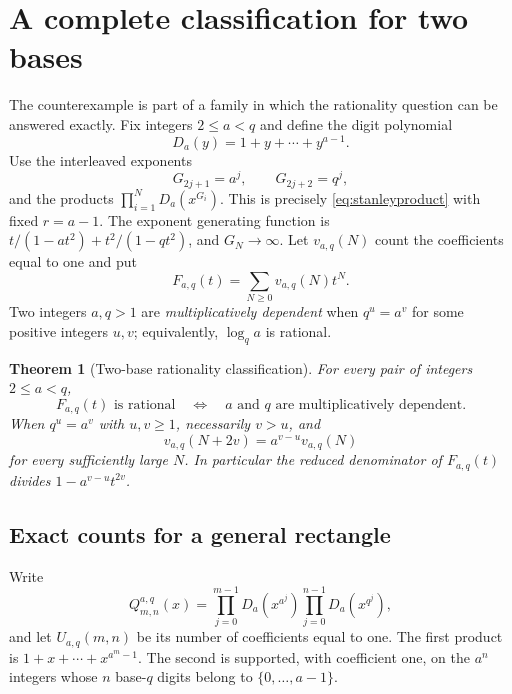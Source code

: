 \documentclass[11pt,letterpaper]{article}
\numberwithin{equation}{section}
\newtheorem{theorem}{Theorem}[section]
\theoremstyle{definition}
\theoremstyle{remark}
\begin{document}
\section{A complete classification for two bases}\label{sec:general}

The counterexample is part of a family in which the rationality question
can be answered exactly. Fix integers $2\le a<q$ and define the digit
polynomial
\begin{equation}\label{eq:digitpoly}
 D_a(y)=1+y+\cdots+y^{a-1}.
\end{equation}
Use the interleaved exponents
\begin{equation}\label{eq:generalexponents}
 G_{2j+1}=a^j,\qquad G_{2j+2}=q^j,
\end{equation}
and the products $\prod_{i=1}^N D_a(x^{G_i})$. This is precisely
\eqref{eq:stanleyproduct} with fixed $r=a-1$. The exponent generating
function is $t/(1-at^2)+t^2/(1-qt^2)$, and $G_N\to\infty$.
Let $v_{a,q}(N)$ count the coefficients equal to one and put
\[
 F_{a,q}(t)=\sum_{N\ge0}v_{a,q}(N)t^N.
\]
Two integers $a,q>1$ are \emph{multiplicatively dependent} when
$q^u=a^v$ for some positive integers $u,v$; equivalently,
$\log_q a$ is rational.

\begin{theorem}[Two-base rationality classification]\label{thm:classification}
For every pair of integers $2\le a<q$,
\begin{equation}\label{eq:classification}
 F_{a,q}(t)\text{ is rational}
 \quad\Longleftrightarrow\quad
 a\text{ and }q\text{ are multiplicatively dependent}.
\end{equation}
When $q^u=a^v$ with $u,v\ge1$, necessarily $v>u$, and
\begin{equation}\label{eq:eventualdependent}
 v_{a,q}(N+2v)=a^{v-u}v_{a,q}(N)
\end{equation}
for every sufficiently large $N$. In particular the reduced denominator
of $F_{a,q}(t)$ divides $1-a^{v-u}t^{2v}$.
\end{theorem}

\subsection{Exact counts for a general rectangle}
Write
\begin{equation}\label{eq:generalrectangle}
 Q^{a,q}_{m,n}(x)=
 \prod_{j=0}^{m-1}D_a(x^{a^j})
 \prod_{j=0}^{n-1}D_a(x^{q^j}),
\end{equation}
and let $U_{a,q}(m,n)$ be its number of coefficients equal to one.
The first product is $1+x+\cdots+x^{a^m-1}$. The second is supported,
with coefficient one, on the $a^n$ integers whose $n$ base-$q$ digits
belong to $\{0,\ldots,a-1\}$.
\end{document}

